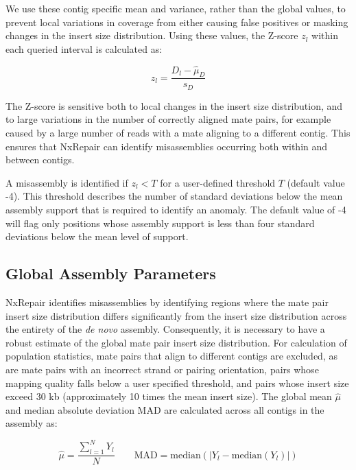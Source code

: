 \documentclass[fleqn,10pt]{wlpeerj}
\begin{document}
We use these contig specific mean and variance, rather than the global values, to prevent local variations in coverage from either causing false positives or masking changes in the insert size distribution. Using these values, the Z-score $z_l$ within each queried interval is calculated as: 

\begin{equation}
z_l = \frac{D_l - \hat{\mu}_D}{s_D}
\label{eq:zscore}
\end{equation}

The Z-score is sensitive both to local changes in the insert size distribution, and to large variations in the number of correctly aligned mate pairs, for example caused by a large number of reads with a mate aligning to a different contig. This ensures that NxRepair can identify misassemblies occurring both within and between contigs.  

A misassembly is identified if $z_l < T$ for a user-defined threshold $T$ (default value -4). This threshold describes the number of standard deviations below the mean assembly support that is required to identify an anomaly. The default value of -4 will flag only positions whose assembly support is less than four standard deviations below the mean level of support.

\subsection*{Global Assembly Parameters}
NxRepair identifies misassemblies by identifying regions where the mate pair insert size distribution differs significantly from the insert size distribution across the entirety of the \textit{de novo} assembly. Consequently, it is necessary to have a robust estimate of the global mate pair insert size distribution. For calculation of population statistics, mate pairs that align to different contigs are excluded, as are mate pairs with an incorrect strand or pairing orientation, pairs whose mapping quality falls below a user specified threshold, and pairs whose insert size exceed 30 kb (approximately 10 times the mean insert size). The global mean $\hat{\mu}$ and median absolute deviation $\text{MAD}$ are calculated across all contigs in the assembly as:

\begin{equation}
\hat{\mu} = \frac{\sum_{l=1}^N Y_l}{N} \qquad \text{MAD} = \text{median}(|Y_l - \text{median}(Y_l)|)
\label{eq:global}
\end{equation}
\end{document}
